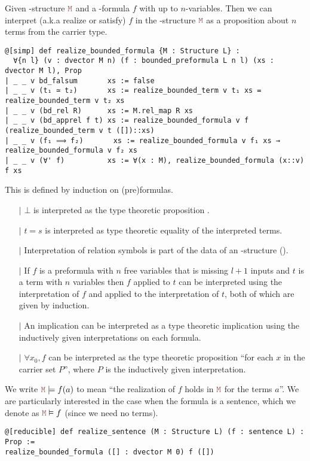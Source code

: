 \begin{dfn}

    Given -structure $\code{M}$ and a -formula $f$ with up to $n$-variables.
    Then we can interpret (a.k.a realize or satisfy) $f$ in the -structure $\code{M}$ as a
    proposition about $n$ terms from the carrier type.

    \begin{lstlisting}
@[simp] def realize_bounded_formula {M : Structure L} :
  ∀{n l} (v : dvector M n) (f : bounded_preformula L n l) (xs : dvector M l), Prop
| _ _ v bd_falsum       xs := false
| _ _ v (t₁ ≃ t₂)       xs := realize_bounded_term v t₁ xs = realize_bounded_term v t₂ xs
| _ _ v (bd_rel R)      xs := M.rel_map R xs
| _ _ v (bd_apprel f t) xs := realize_bounded_formula v f (realize_bounded_term v t ([])::xs)
| _ _ v (f₁ ⟹ f₂)       xs := realize_bounded_formula v f₁ xs → realize_bounded_formula v f₂ xs
| _ _ v (∀' f)          xs := ∀(x : M), realize_bounded_formula (x::v) f xs \end{lstlisting}

  This is defined by induction on (pre)formulas.
  \begin{itemize}
    \item[$\vert$] $\bot$ is interpreted as the type theoretic proposition .
    \item[$\vert$] $t = s$ is interpreted as type theoretic equality of the interpreted terms.
    \item[$\vert$] Interpretation of relation symbols is part of the data of an
          -structure ().
    \item[$\vert$] If $f$ is a preformula with $n$ free variables that is missing
          $l + 1$ inputs and $t$ is a term with $n$ variables
          then $f$ applied to $t$ can be interpreted using the interpretation of $f$ and
          applied to the interpretation of $t$, both of which are given by induction.
    \item[$\vert$] An implication can be interpreted as a type theoretic implication
          using the inductively given interpretations on each formula.
    \item[$\vert$] $\forall x_{0}, f$ can be interpreted as the type theoretic proposition
          ``for each $x$ in the carrier set $P$'',
          where $P$ is the inductively given interpretation.
  \end{itemize}

  We write $\code{M} \models f(a)$ to mean ``the realization of $f$ holds in $\code{M}$ for the terms $a$''.
  We are particularly interested in the case when the formula is a sentence,
  which we denote as $\code{M} \vDash f$ (since we need no terms).
  \begin{lstlisting}
@[reducible] def realize_sentence (M : Structure L) (f : sentence L) : Prop :=
realize_bounded_formula ([] : dvector M 0) f ([])\end{lstlisting}
\end{dfn}

